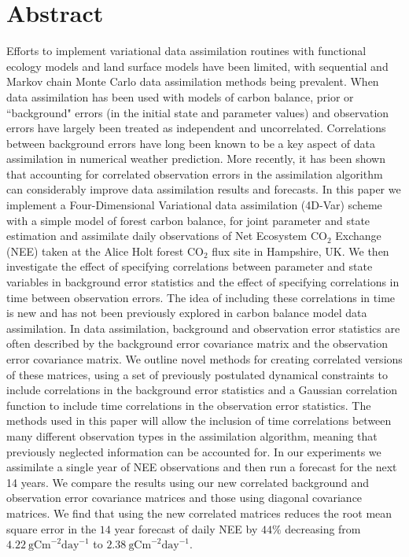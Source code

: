 
\section{Abstract}
Efforts to implement variational data assimilation routines with functional ecology models and land surface models have been limited, with sequential and Markov chain Monte Carlo data assimilation methods being prevalent. When data assimilation has been used with models of carbon balance, prior or ``background" errors (in the initial state and parameter values) and observation errors have largely been treated as independent and uncorrelated. Correlations between background errors have long been known to be a key aspect of data assimilation in numerical weather prediction. More recently, it has been shown that accounting for correlated observation errors in the assimilation algorithm can considerably improve data assimilation results and forecasts. In this paper we implement a Four-Dimensional Variational data assimilation (4D-Var) scheme with a simple model of forest carbon balance, for joint parameter and state estimation and assimilate daily observations of Net Ecosystem $\text{CO}_{2}$ Exchange (NEE) taken at the Alice Holt forest $\text{CO}_2$ flux site in Hampshire, UK. We then investigate the effect of specifying correlations between parameter and state variables in background error statistics and the effect of specifying correlations in time between observation errors. The idea of including these correlations in time is new and has not been previously explored in carbon balance model data assimilation. In data assimilation, background and observation error statistics are often described by the background error covariance matrix and the observation error covariance matrix. We outline novel methods for creating correlated versions of these matrices, using a set of previously postulated dynamical constraints to include correlations in the background error statistics and a Gaussian correlation function to include time correlations in the observation error statistics. The methods used in this paper will allow the inclusion of time correlations between many different observation types in the assimilation algorithm, meaning that previously neglected information can be accounted for. In our experiments we assimilate a single year of NEE observations and then run a forecast for the next 14 years. We compare the results using our new correlated background and observation error covariance matrices and those using diagonal covariance matrices. We find that using the new correlated matrices reduces the root mean square error in the $14$ year forecast of daily NEE by $44\%$ decreasing from $4.22~\text{gCm}^{-2}\text{day}^{-1}$ to $2.38~\text{gCm}^{-2}\text{day}^{-1}$.     

